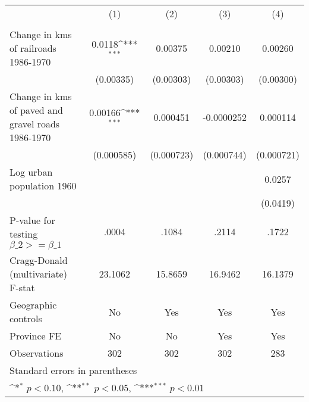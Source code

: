 {
\def\sym#1{\ifmmode^{#1}\else\(^{#1}\)\fi}
\begin{tabular}{l*{4}{c}}
\hline\hline
                &\multicolumn{1}{c}{(1)}&\multicolumn{1}{c}{(2)}&\multicolumn{1}{c}{(3)}&\multicolumn{1}{c}{(4)}\\
                &\multicolumn{1}{c}{}&\multicolumn{1}{c}{}&\multicolumn{1}{c}{}&\multicolumn{1}{c}{}\\
\hline
Change in kms of railroads 1986-1970&   0.0118\sym{***}&  0.00375         &  0.00210         &  0.00260         \\
                &(0.00335)         &(0.00303)         &(0.00303)         &(0.00300)         \\
[1em]
Change in kms of paved and gravel roads 1986-1970&  0.00166\sym{***}& 0.000451         &-0.0000252         & 0.000114         \\
                &(0.000585)         &(0.000723)         &(0.000744)         &(0.000721)         \\
[1em]
Log urban population 1960&                  &                  &                  &   0.0257         \\
                &                  &                  &                  & (0.0419)         \\
\hline
P-value for testing $\beta\_{2} >= \beta\_{1}$&    .0004         &    .1084         &    .2114         &    .1722         \\
Cragg-Donald (multivariate) F-stat&  23.1062         &  15.8659         &  16.9462         &  16.1379         \\
Geographic controls&       No         &      Yes         &      Yes         &      Yes         \\
Province FE     &       No         &       No         &      Yes         &      Yes         \\
Observations    &      302         &      302         &      302         &      283         \\
\hline\hline
\multicolumn{5}{l}{\footnotesize Standard errors in parentheses}\\
\multicolumn{5}{l}{\footnotesize \sym{*} \(p<0.10\), \sym{**} \(p<0.05\), \sym{***} \(p<0.01\)}\\
\end{tabular}
}
